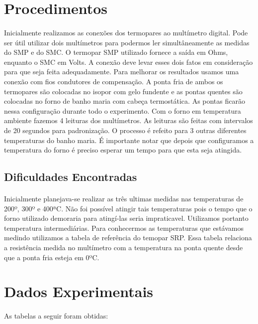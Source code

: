 \documentclass[a4paper,11pt]{article}
\begin{document}
\section{Procedimentos}
\paragraph{}Inicialmente realizamos as conexões dos termopares ao multímetro digital. 
Pode ser útil utilizar dois multímetros para podermos ler simultâneamente as medidas
do SMP e do SMC. O termopar SMP utilizado fornece a saída em Ohms, enquanto o SMC em 
Volts. A conexão deve levar esses dois fatos em consideração para
que seja feita adequadamente. Para melhorar os resultados usamos uma conexão
com fios condutores de compensação.
A ponta fria de ambos os termopares são colocadas no isopor com gelo fundente e as pontas quentes são
colocadas no forno de banho maria com cabeça termostática.  As pontas ficarão
nessa configuração durante todo o experimento. Com o forno em temperatura ambiente
fazemos 4 leituras dos multímetros. As leituras são feitas com intervalos de 20 segundos
para padronização. O processo é refeito para 3 outras diferentes temperaturas do banho maria.
É importante notar que depois que configuramos a temperatura do forno é preciso esperar um
tempo para que esta seja atingida. 

\subsection{Dificuldades Encontradas}
\paragraph{}Inicialmente planejava-se realizar as três ultimas medidas nas temperaturas de
200º, 300º e 400ªC. Não foi possível atingir tais temperaturas pois o tempo que o forno
utilizado demoraria para atingí-las seria impraticavel. Utilizamos portanto temperatura
intermediárias. Para conhecermos as temperaturas que estávamos medindo utilizamos a tabela
de referência do temopar SRP. Essa tabela relaciona a resistência medida no multímetro
com a temperatura na ponta quente desde que a ponta fria esteja em 0ºC. 

\newpage

\section{Dados Experimentais}
\paragraph{}As tabelas a seguir foram obtidas:
\end{document}
